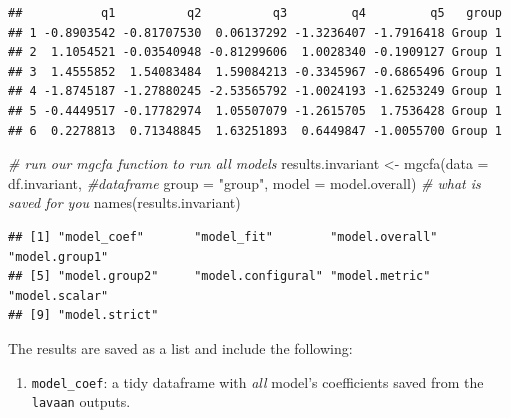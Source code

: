 \documentclass[
  man]{apa6}
\newenvironment{Shaded}{\begin{snugshade}}{\end{snugshade}}
\newcommand{\AttributeTok}[1]{\textcolor[rgb]{0.77,0.63,0.00}{#1}}
\newcommand{\CommentTok}[1]{\textcolor[rgb]{0.56,0.35,0.01}{\textit{#1}}}
\newcommand{\FunctionTok}[1]{\textcolor[rgb]{0.00,0.00,0.00}{#1}}
\newcommand{\NormalTok}[1]{#1}
\newcommand{\OtherTok}[1]{\textcolor[rgb]{0.56,0.35,0.01}{#1}}
\newcommand{\SpecialCharTok}[1]{\textcolor[rgb]{0.00,0.00,0.00}{#1}}
\newcommand{\StringTok}[1]{\textcolor[rgb]{0.31,0.60,0.02}{#1}}
\providecommand{\tightlist}{%
  \setlength{\itemsep}{0pt}\setlength{\parskip}{0pt}}
\begin{document}
\normalsize

\begin{verbatim}
##           q1          q2          q3         q4         q5   group
## 1 -0.8903542 -0.81707530  0.06137292 -1.3236407 -1.7916418 Group 1
## 2  1.1054521 -0.03540948 -0.81299606  1.0028340 -0.1909127 Group 1
## 3  1.4555852  1.54083484  1.59084213 -0.3345967 -0.6865496 Group 1
## 4 -1.8745187 -1.27880245 -2.53565792 -1.0024193 -1.6253249 Group 1
## 5 -0.4449517 -0.17782974  1.05507079 -1.2615705  1.7536428 Group 1
## 6  0.2278813  0.71348845  1.63251893  0.6449847 -1.0055700 Group 1
\end{verbatim}

\small

\begin{Shaded}
\begin{Highlighting}[]
\CommentTok{\# run our mgcfa function to run all models}
\NormalTok{results.invariant }\OtherTok{\textless{}{-}} \FunctionTok{mgcfa}\NormalTok{(}\AttributeTok{data =}\NormalTok{ df.invariant, }\CommentTok{\#dataframe}
                           \AttributeTok{group =} \StringTok{"group"}\NormalTok{, }
                           \AttributeTok{model =}\NormalTok{ model.overall)}
\CommentTok{\# what is saved for you}
\FunctionTok{names}\NormalTok{(results.invariant)}
\end{Highlighting}
\end{Shaded}

\normalsize

\begin{verbatim}
## [1] "model_coef"       "model_fit"        "model.overall"    "model.group1"    
## [5] "model.group2"     "model.configural" "model.metric"     "model.scalar"    
## [9] "model.strict"
\end{verbatim}

The results are saved as a list and include the following:

\begin{enumerate}
\def\labelenumi{\arabic{enumi})}
\tightlist
\item
  \texttt{model\_coef}: a tidy dataframe with \emph{all} model's coefficients saved from the \texttt{lavaan} outputs.
\end{enumerate}

\small

\begin{Shaded}
\end{Shaded}
\end{document}
